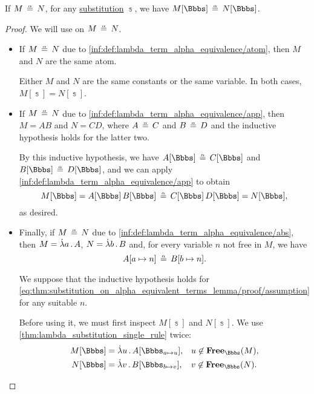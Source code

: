 \begin{proposition}\label{thm:substitution_on_alpha_equivalent_terms}
  If \( M \aequiv N \), for any \hyperref[def:lambda_term_substitution]{substitution} \( \Bbbs \), we have \( M[\Bbbs] \aequiv N[\Bbbs] \).
\end{proposition}
\begin{proof}
  We will use  on \( M \aequiv N \).

  \begin{itemize}
    \item If \( M \aequiv N \) due to \ref{inf:def:lambda_term_alpha_equivalence/atom}, then \( M \) and \( N \) are the same atom.

    Either \( M \) and \( N \) are the same constants or the same variable. In both cases, \( M[\Bbbs] = N[\Bbbs] \).

    \item If \( M \aequiv N \) due to \ref{inf:def:lambda_term_alpha_equivalence/app}, then \( M = AB \) and \( N = CD \), where \( A \aequiv C \) and \( B \aequiv D \) and the inductive hypothesis holds for the latter two.

    By this inductive hypothesis, we have \( A[\Bbbs] \aequiv C[\Bbbs] \) and \( B[\Bbbs] \aequiv D[\Bbbs] \), and we can apply \ref{inf:def:lambda_term_alpha_equivalence/app} to obtain
    \begin{equation*}
      M[\Bbbs]
      =
      A[\Bbbs] \thinspace B[\Bbbs]
      \aequiv
      C[\Bbbs] \thinspace D[\Bbbs]
      =
      N[\Bbbs],
    \end{equation*}
    as desired.

    \item Finally, if \( M \aequiv N \) due to \ref{inf:def:lambda_term_alpha_equivalence/abs}, then \( M = \qabs a A \), \( N = \qabs b B \) and, for every variable \( n \) not free in \( M \), we have
    \begin{equation}\label{eq:thm:substitution_on_alpha_equivalent_terms_lemma/proof/assumption}
      A[a \mapsto n] \aequiv B[b \mapsto n].
    \end{equation}

    We suppose that the inductive hypothesis holds for \eqref{eq:thm:substitution_on_alpha_equivalent_terms_lemma/proof/assumption} for any suitable \( n \).

    Before using it, we must first inspect \( M[\Bbbs] \) and \( N[\Bbbs] \). We use \cref{thm:lambda_substitution_single_rule} twice:
    \begin{align*}
      M[\Bbbs] &= \qabs u A[\Bbbs_{a \mapsto u}], &&u \not\in \op*{Free}_\Bbbs(M), \\
      N[\Bbbs] &= \qabs v B[\Bbbs_{b \mapsto v}], &&v \not\in \op*{Free}_\Bbbs(N).
    \end{align*}


\end{itemize}
\end{proof}
